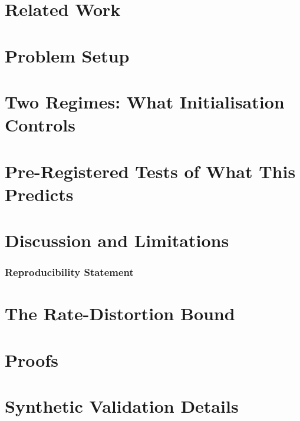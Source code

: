 \section{Related Work}\label{sec:related_work}


\section{Problem Setup}\label{sec:setup}



\section{Two Regimes: What Initialisation Controls}\label{sec:regimes}


\section{Pre-Registered Tests of What This Predicts}\label{sec:methods}


\section{Discussion and Limitations}\label{sec:discussion}\label{sec:future}


\subsubsection*{Reproducibility Statement}




\appendix
\section{The Rate-Distortion Bound}\label{app:rd}\label{sec:lower}\label{sec:lower_bound}\label{sec:achv}\label{sec:achievability}


\section{Proofs}\label{app:proofs}


\section{Synthetic Validation Details}\label{app:synthetic}



